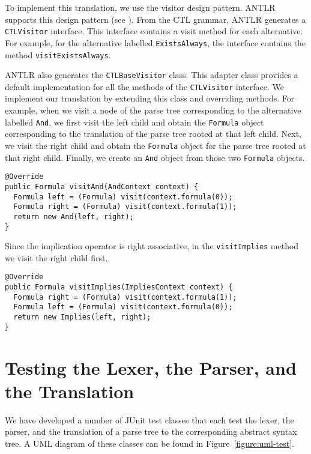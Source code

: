 \documentclass[12pt]{article}
\theoremstyle{definition}
\begin{document}
To implement this translation, we use the visitor design pattern.  ANTLR supports this design pattern (see \cite[Section~7.3]{P13}).  From the CTL grammar, ANTLR generates a \lstinline{CTLVisitor} interface.  This interface contains a visit method for each alternative.  For example, for the alternative labelled \lstinline{ExistsAlways}, the interface contains the method \lstinline{visitExistsAlways}.

ANTLR also generates the \lstinline{CTLBaseVisitor} class.  This adapter class provides a default implementation for all the methods of the \lstinline{CTLVisitor} interface.  We implement our translation by extending this class and overriding methods.  For example, when we visit a node of the parse tree corresponding to the alternative labelled \lstinline{And}, we first visit the left child and obtain the \lstinline{Formula} object corresponding to the translation of the parse tree rooted at that left child.  Next, we visit the right child and obtain the \lstinline{Formula} object for the parse tree rooted at that right child.  Finally, we create an \lstinline{And} object from those two \lstinline{Formula} objects.

\begin{lstlisting}
@Override
public Formula visitAnd(AndContext context) {
  Formula left = (Formula) visit(context.formula(0));
  Formula right = (Formula) visit(context.formula(1));
  return new And(left, right);
}
\end{lstlisting}

Since the implication operator is right associative, in the \lstinline{visitImplies} method we visit the right child first.
\begin{lstlisting}
@Override
public Formula visitImplies(ImpliesContext context) {
  Formula right = (Formula) visit(context.formula(1));
  Formula left = (Formula) visit(context.formula(0));
  return new Implies(left, right);
}
\end{lstlisting}

\section{Testing the Lexer, the Parser, and the Translation}

We have developed a number of JUnit test classes that each test the lexer, the parser, and the translation of a parse tree to the corresponding abstract syntax tree.  A UML diagram of these classes can be found in Figure~\ref{figure:uml-test}.
\end{document}
